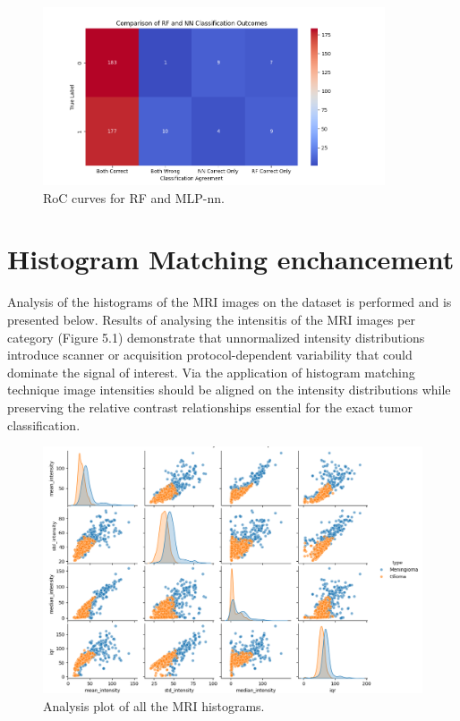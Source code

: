 \documentclass[11pt,a4paper]{article}
\begin{document}
		\begin{figure}[H]
			\centering
			\includegraphics[width=0.9\textwidth]{images/comparison.png}
			\caption{RoC curves for RF and MLP-nn.}
			\label{fig1:}
		\end{figure}		


\section{Histogram Matching enchancement}


Analysis of the histograms of the MRI images on the dataset is performed
and is presented below. Results of analysing the intensitis of the 
MRI images per category (Figure 5.1)
demonstrate that unnormalized intensity distributions introduce scanner 
or acquisition protocol-dependent variability that
could dominate the signal of interest. 
Via the application of histogram matching technique image 
intensities should be aligned on the intensity distributions 
while preserving the relative contrast relationships 
essential for the exact tumor classification.

		\begin{figure}[H]
			\centering
			\includegraphics[width=1.0\textwidth]{images/histogram_analysis_unmatched.png}
			\caption{Analysis plot of all the MRI histograms.}
			\label{fig1:}
		\end{figure}		
\end{document}
